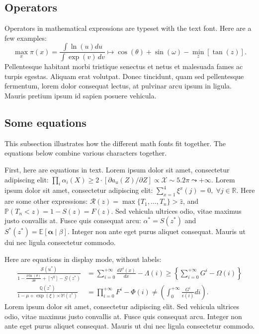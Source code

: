 \documentclass[letterpaper,11pt,leqno]{article}
\begin{document}
\subsection{Operators} 

Operators in mathematical expressions are typeset with the text font. Here are a few examples: 
\begin{equation*}
\max_x \pi(x) = \frac{\int \ln(u)du}{\int\exp(v)\,dv} \mapsto \cos(\theta) + \sin(\omega) - \min_z[\tan(z)].
\end{equation*}
Pellentesque habitant morbi tristique senectus et netus et malesuada fames ac turpis egestas. Aliquam erat volutpat. Donec tincidunt, quam sed pellentesque fermentum, lorem dolor consequat lectus, at pulvinar arcu ipsum in ligula. Mauris pretium ipsum id sapien posuere vehicula. 

\subsection{Some equations} 

This subsection illustrates how the different math fonts fit together. The equations below combine various characters together.

First, here are equations in text. Lorem ipsum dolor sit amet, consectetur adipiscing elit: $\prod_i\alpha_i(X) \geq 2 \cdot [\partial a_u(Z)/\partial Z] \propto \mathcal{X} \sim 5.2\pi \leadsto +\infty$. Lorem ipsum dolor sit amet, consectetur adipiscing elit: $\sum_{x=1}^4 \xi^x(j)=0, \; \forall j\in \mathbb{R}$. Here are some other expressions: $\mathcal{R}(z) = \max\{T_1,\ldots,T_{n}\} > \hat{z}$, and  $\mathbb{P}(T_n < z) = 1 - S(z) = F(z)$.  Sed vehicula ultrices odio, vitae maximus justo convallis at. Fusce quis consequat arcu: $\alpha^* = S(z^*)$ and $S^*(z^*)=\mathbb{E}[\bm{\alpha}\mid \beta]$. Integer non ante eget purus aliquet consequat. Mauris ut dui nec ligula consectetur commodo.

Here are equations in display mode, without labels:
\begin{align*}
\frac{\mathcal{S}(u^*)}{1 - \frac{\partial \ln(\theta)}{\partial \theta} + \left[\gamma^\eta\right] - \mathcal{G}(z^*)} &= \sum_{i=0}^{+\infty}\frac{d F^{i}(x)}{d x} - \Lambda(i) \geq \left\lbrace\sum_{i=0}^{+\infty}G^{i} - \Omega(i)\right\rbrace\\
\frac{\mathbb{Q}(z^*)}{1 -\mu + \exp(\xi) \times \mathbb{M}(z^*)} &= \prod_{i=0}^{+\infty}F^{i} - \Phi(i) \neq \left(\int_{0}^{+\infty}\frac{G^{i}}{\epsilon(i)} di\right).
\end{align*}
Lorem ipsum dolor sit amet, consectetur adipiscing elit. Sed vehicula ultrices odio, vitae maximus justo convallis at. Fusce quis consequat arcu. Integer non ante eget purus aliquet consequat. Mauris ut dui nec ligula consectetur commodo.
\end{document}
